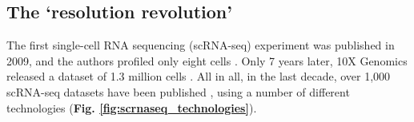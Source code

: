 
 






\subsection{The `resolution revolution'}
\label{sec:scrnaseq}

The first single-cell RNA sequencing (scRNA-seq) experiment was published in 2009, and the authors profiled only eight cells \cite{tang2009mrna}. 
Only 7 years later, 10X Genomics released a dataset of 
1.3 million cells \cite{102016our}.
All in all, in the last decade, over 1,000 scRNA-seq datasets have been published 
\cite{svensson2018exponential, svensson2019curated, svensson2020single},
using a number of different technologies 
\cite{islam2011characterization, hashimshony2012cel, ramskold2012full, picelli2013smart, sasagawa2013quartz, jaitin2014massively, macosko2015highly,klein2015droplet, gierahn2017seq, zheng2017massively, hagemann2020single}
(\textbf{Fig. \ref{fig:scrnaseq_technologies}}). \\

